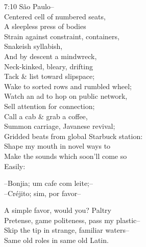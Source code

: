 


7:10 São Paulo-- \\
Centered cell of numbered seats, \\
A sleepless press of bodies \\
Strain against constraint, containers, \\
Snakeish syllabish, \\
And by descent a mindwreck, \\
Neck-kinked, bleary, drifting \\
Tack \& list toward slipspace; \\
Wake to sorted rows and rumbled wheel; \\
Watch an ad to hop on public network, \\
Sell attention for connection; \\
Call a cab \& grab a coffee, \\
Summon carriage, Javanese revival; \\
Gridded beats from global Starbuck station: \\
Shape my mouth in novel ways to \\
Make the sounds which soon'll come so \\
Easily:

--Bonjia; um cafe com leite;-- \\
--Créjito; sim, por favor--

A simple favor, would you? Paltry \\
Pretense, game politeness, pass my plastic-- \\
Skip the tip in strange, familiar waters-- \\
Same old roles in same old Latin.